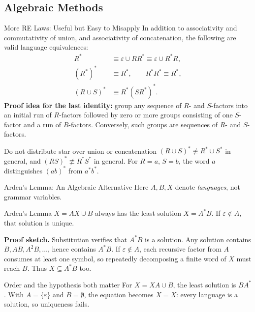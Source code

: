 \documentclass[10pt]{beamer}
\begin{document}
\subsection{Algebraic Methods}

\begin{frame}{More RE Laws: Useful but Easy to Misapply}
  \small
  In addition to associativity and commutativity of union, and associativity
  of concatenation, the following are valid language equivalences:
  \[
    \begin{aligned}
      R^*&\equiv\varepsilon\cup RR^*
          \equiv\varepsilon\cup R^*R,\\
      (R^*)^*&\equiv R^*,\qquad R^*R^*\equiv R^*,\\
      (R\cup S)^*&\equiv R^*(SR^*)^*.
    \end{aligned}
  \]
  \pause
  \textbf{Proof idea for the last identity:} group any sequence of $R$- and
  $S$-factors into an initial run of $R$-factors followed by zero or more
  groups consisting of one $S$-factor and a run of $R$-factors.
  Conversely, such groups are sequences of $R$- and $S$-factors.
  \pause
  \begin{alertblock}{Do not distribute star over union or concatenation}
    $(R\cup S)^*\not\equiv R^*\cup S^*$ in general, and
    $(RS)^*\not\equiv R^*S^*$ in general. For $R=a$, $S=b$, the word $a$
    distinguishes $(ab)^*$ from $a^*b^*$.
  \end{alertblock}
\end{frame}

\begin{frame}{Arden's Lemma: An Algebraic Alternative}
  \small
  Here $A,B,X$ denote \emph{languages}, not grammar variables.
  \begin{block}{Arden's Lemma}
    $X=AX\cup B$ always has the least solution $X=A^*B$.
    If $\varepsilon\notin A$, that solution is unique.
  \end{block}
  \pause
  \textbf{Proof sketch.} Substitution verifies that $A^*B$ is a solution.
  Any solution contains $B,AB,A^2B,\ldots$, hence contains $A^*B$.
  If $\varepsilon\notin A$, each recursive factor from $A$ consumes at
  least one symbol, so repeatedly decomposing a finite word of $X$ must
  reach $B$. Thus $X\subseteq A^*B$ too.
  \pause
  \begin{alertblock}{Order and the hypothesis both matter}
    For $X=XA\cup B$, the least solution is $BA^*$.
    With $A=\{\varepsilon\}$ and $B=\emptyset$, the equation becomes $X=X$:
    every language is a solution, so uniqueness fails.
  \end{alertblock}
\end{frame}
\end{document}

